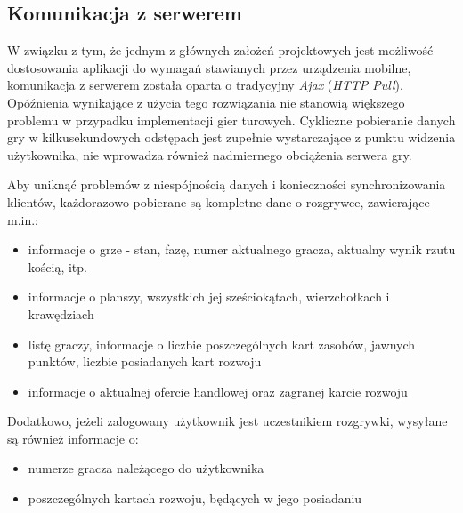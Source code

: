 \documentclass[a4paper,12pt]{article}
\begin{document}
\subsection{Komunikacja z serwerem}

W związku z tym, że jednym z głównych założeń projektowych jest
możliwość dostosowania aplikacji do wymagań stawianych przez
urządzenia mobilne, komunikacja z serwerem została oparta o tradycyjny
\emph{Ajax} (\emph{HTTP Pull}). Opóźnienia wynikające z użycia tego
rozwiązania nie stanowią większego problemu w przypadku implementacji
gier turowych. Cykliczne pobieranie danych gry w kilkusekundowych
odstępach jest zupełnie wystarczające z punktu widzenia użytkownika,
nie wprowadza również nadmiernego obciążenia serwera gry.

Aby uniknąć problemów z niespójnością danych i konieczności
synchronizowania klientów, każdorazowo pobierane są kompletne dane o
rozgrywce, zawierające m.in.:

\begin{itemize}
\item informacje o grze - stan, fazę, numer aktualnego gracza,
  aktualny wynik rzutu kością, itp.
\item informacje o planszy, wszystkich jej sześciokątach,
  wierzchołkach i krawędziach
\item listę graczy, informacje o liczbie poszczególnych kart zasobów,
  jawnych punktów, liczbie posiadanych kart rozwoju
\item informacje o aktualnej ofercie handlowej oraz zagranej karcie
  rozwoju
\end{itemize}

Dodatkowo, jeżeli zalogowany użytkownik jest uczestnikiem rozgrywki,
wysyłane są również informacje o:

\begin{itemize}
\item numerze gracza należącego do użytkownika
\item poszczególnych kartach rozwoju, będących w jego posiadaniu
\end{itemize}
\end{document}
